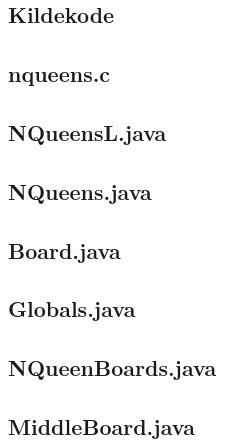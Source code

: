 \begin{landscape}
\section{Kildekode}
\tiny
\subsection{nqueens.c}\label{nqueenc}

\subsection{NQueensL.java}\label{nqueensl}

\subsection{NQueens.java}\label{nqueens}

\subsection{Board.java}\label{board}

\subsection{Globals.java}\label{globals}

\subsection{NQueenBoards.java}\label{nqueenboards}

\subsection{MiddleBoard.java}\label{middleboard}


\end{landscape}
